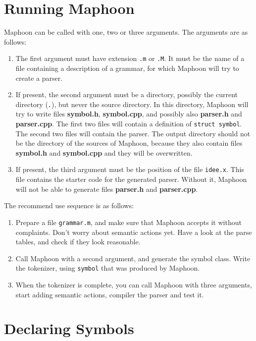 \documentclass{article}
\begin{document}
\section{Running Maphoon}

Maphoon can be called with one, two or three arguments.
The arguments are as follows:
\begin{enumerate}
\item
   The first argument must have extension \verb+.m+
   or \verb+.M+. 
   It must be the name of a file containing a description of
   a grammar, for which Maphoon will try to create a parser. 
\item
   If present, the second argument 
   must be a directory, possibly the current
   directory (\verb+.+), but never the source directory.
   In this directory, 
   Maphoon will try to write files {\bf symbol.h}, 
   {\bf symbol.cpp}, and possibly also
   {\bf parser.h} and {\bf parser.cpp}. 
   The first two files will contain a definition of \verb+struct symbol+.
   The second two files will contain the parser. 
   The output directory should not be the directory
   of the sources of Maphoon, because they also contain 
   files {\bf symbol.h} and {\bf symbol.cpp}
   and they will be overwritten. 
\item
   If present, the third argument must be 
   the position of the file \verb+idee.x+.
   This file contains the starter code for the generated parser.
   Without it, Maphoon will not be able to
   generate files {\bf parser.h} and
   {\bf parser.cpp}. 
\end{enumerate}

\noindent
The recommend use sequence is as follows:
\begin{enumerate}
\item
   Prepare a file \verb+grammar.m+, and make sure that
   Maphoon accepts it without complaints. Don't worry about
   semantic actions yet. 
   Have a look at the parse tables, and check
   if they look reasonable. 
\item
   Call Maphoon with a second argument, and generate the 
   symbol class. 
   Write the tokenizer, using \verb+symbol+ that was
   produced by Maphoon. 
\item
   When the tokenizer is complete, you can call Maphoon with
   three arguments, start adding semantic actions, 
   compiler the parser and test it. 
\end{enumerate}

\section{Declaring Symbols}
\end{document}
